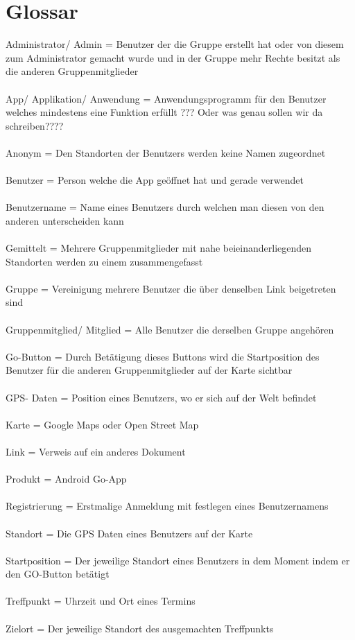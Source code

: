 \section{Glossar}

Administrator/ Admin = Benutzer der die Gruppe erstellt hat oder von diesem zum Administrator gemacht wurde und in der Gruppe mehr Rechte besitzt als die anderen Gruppenmitglieder\\
\\
App/ Applikation/ Anwendung = Anwendungsprogramm für den Benutzer welches mindestens eine Funktion erfüllt ??? Oder was genau sollen wir da schreiben????\\
\\
Anonym = Den Standorten der Benutzers werden keine Namen zugeordnet\\
\\
Benutzer = Person welche die App geöffnet hat und gerade verwendet\\
\\
Benutzername = Name eines Benutzers durch welchen man diesen von den anderen unterscheiden kann\\
\\
Gemittelt = Mehrere Gruppenmitglieder mit nahe beieinanderliegenden Standorten werden zu einem zusammengefasst\\
\\
Gruppe = Vereinigung mehrere Benutzer die über denselben Link beigetreten sind\\
\\
Gruppenmitglied/ Mitglied = Alle Benutzer die derselben Gruppe angehören\\
\\
Go-Button = Durch Betätigung dieses Buttons wird die Startposition des Benutzer für die anderen Gruppenmitglieder auf der Karte sichtbar\\
\\
GPS- Daten = Position eines Benutzers, wo er sich auf der Welt befindet\\
\\
Karte = Google Maps oder Open Street Map\\
\\
Link = Verweis auf ein anderes Dokument \\
\\
Produkt = Android Go-App\\
\\
Registrierung = Erstmalige Anmeldung mit festlegen eines Benutzernamens\\
\\
Standort = Die GPS Daten eines Benutzers auf der Karte\\
\\
Startposition = Der jeweilige Standort eines Benutzers in dem Moment indem er den GO-Button betätigt\\
\\
Treffpunkt = Uhrzeit und Ort eines Termins\\
\\
Zielort = Der jeweilige Standort des ausgemachten Treffpunkts\\
\\








